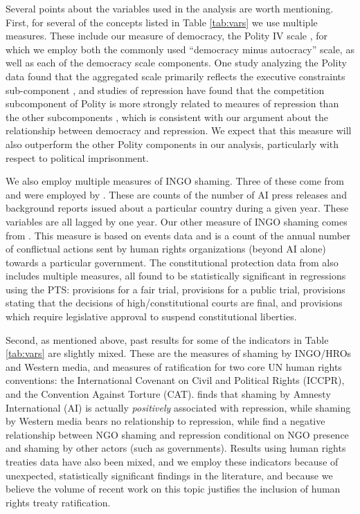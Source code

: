 \documentclass[12pt]{article}
\begin{document}
Several points about the variables used in the analysis are worth mentioning. First, for several of the concepts listed in Table \ref{tab:vars} we use multiple measures. These include our measure of democracy, the Polity IV scale \citep{MarshallJaggers2009}, for which we employ both the commonly used ``democracy minus autocracy'' scale, as well as each of the democracy scale components. One study analyzing the Polity data found that the aggregated scale primarily reflects the executive constraints sub-component \citep{GleditschWard1997}, and studies of repression have found that the competition subcomponent of Polity is more strongly related to meaures of repression than the other subcomponents \citep{Keith2002PRQ, BDMetal2005}, which is consistent with our argument about the relationship between democracy and repression. We expect that this measure will also outperform the other Polity components in our analysis, particularly with respect to political imprisonment. 

We also employ multiple measures of INGO shaming. Three of these come from \citet{RonRamosRodgers2005} and were employed by \citet{HafnerBurton2008}. These are counts of the number of AI press releases and background reports issued about a particular country during a given year. These variables are all lagged by one year. Our other measure of INGO shaming comes from \citet{MurdieDavis2012}. This measure is based on events data and is a count of the annual number of conflictual actions sent by human rights organizations (beyond AI alone) towards a particular government. The constitutional protection data from \citet{KeithTatePoe2009} also includes multiple measures, all found to be statistically significant in regressions using the PTS: provisions for a fair trial, provisions for a public trial, provisions stating that the decisions of high/constitutional courts are final, and provisions which require legislative approval to suspend constitutional liberties. 

Second, as mentioned above, past results for some of the indicators in Table \ref{tab:vars} are slightly mixed. These are the measures of shaming by INGO/HROs and Western media, and measures of ratification for two core UN human rights conventions: the International Covenant on Civil and Political Rights (ICCPR), and the Convention Against Torture (CAT). \citet{HafnerBurton2008} finds that shaming by Amnesty International (AI) is actually {\it positively} associated with repression, while shaming by Western media bears no relationship to repression, while \citet{MurdieDavis2012} find a negative relationship between NGO shaming and repression conditional on NGO presence and shaming by other actors (such as governments). Results using human rights treaties data have also been mixed, and we employ these indicators because of unexpected, statistically significant findings in the literature, and because we believe the volume of recent work on this topic justifies the inclusion of human rights treaty ratification. 
\end{document}
